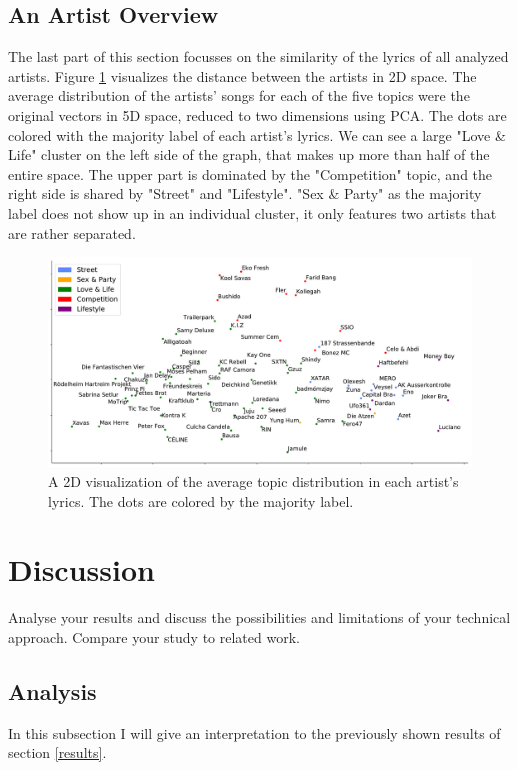 \documentclass[conference]{IEEEtran}
\begin{document}
\subsection{An Artist Overview}
The last part of this section focusses on the similarity of the lyrics of all analyzed artists. Figure \ref{fig:scatter} visualizes the distance between the artists in 2D space. The average distribution of the artists' songs for each of the five topics were the original vectors in 5D space, reduced to two dimensions using PCA. The dots are colored with the majority label of each artist's lyrics. We can see a large "Love \& Life" cluster on the left side of the graph, that makes up more than half of the entire space. The upper part is dominated by the "Competition" topic, and the right side is shared by "Street" and "Lifestyle". "Sex \& Party" as the majority label does not show up in an individual cluster, it only features two artists that are rather separated.

\begin{figure}[!t]
\includegraphics[width=\linewidth]{figures/scatter.pdf}
\vspace*{-8mm}
\caption{A 2D visualization of the average topic distribution in each artist's lyrics. The dots are colored by the majority label.}
\label{fig:scatter}
\end{figure}

\section{Discussion}
Analyse your results and discuss the possibilities and limitations of
your technical approach. Compare your study to related work.
\subsection{Analysis}
In this subsection I will give an interpretation to the previously shown results of section \ref{results}.
\end{document}
